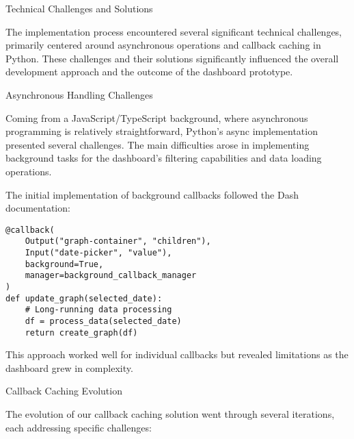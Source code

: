 \begin{section}{Technical Challenges and Solutions}
	\label{sec:implementation-technical-challenges}

	The implementation process encountered several significant technical challenges, primarily centered around asynchronous operations and callback caching in Python.
	These challenges and their solutions significantly influenced the overall development approach and the outcome of the dashboard prototype.

	\begin{subsection}{Asynchronous Handling Challenges}
		\label{subsec:implementation-technical-challenges-async}

		Coming from a JavaScript/TypeScript background, where asynchronous programming is relatively straightforward\cite{node.js_asynchronous_work_javascript_asynchronous_programming_and_callbacks}, Python's async implementation presented several challenges.
		The main difficulties arose in implementing background tasks for the dashboard's filtering capabilities and data loading operations.

		The initial implementation of background callbacks followed the Dash documentation\cite{plotly_dash_plotly_com_background_callbacks}:

		\begin{listing}[H]
			\caption{Initial Background Callback Implementation}
			\begin{verbatim}
@callback(
    Output("graph-container", "children"),
    Input("date-picker", "value"),
    background=True,
    manager=background_callback_manager
)
def update_graph(selected_date):
    # Long-running data processing
    df = process_data(selected_date)
    return create_graph(df)
			\end{verbatim}
			\label{lst:dashboard-implementation-initial-callback}
		\end{listing}

		This approach worked well for individual callbacks but revealed limitations as the dashboard grew in complexity.
	\end{subsection}

	\begin{subsection}{Callback Caching Evolution}
		\label{subsec:implementation-technical-challenges-caching}

		The evolution of our callback caching solution went through several iterations, each addressing specific challenges:


\end{subsection}
\end{section}
